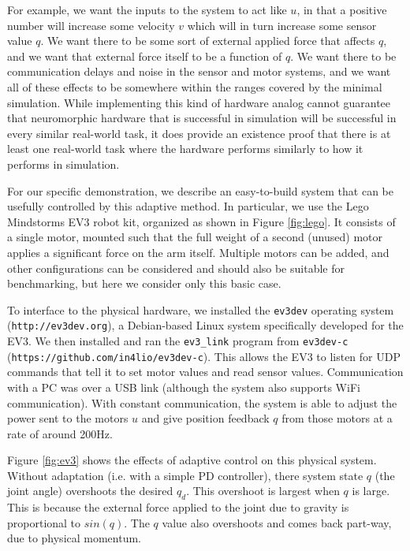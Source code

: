 \documentclass{frontiersSCNS} %
\begin{document}
For example, we want the inputs to the system to act like $u$, in that a
positive number will increase some velocity $v$ which will in turn increase some
sensor value $q$.  We want there to be some sort of external applied force that
affects $q$, and we want that external force itself to be a function of $q$.
We want there to be communication delays and noise in the sensor and motor
systems, and we want all of these effects to be somewhere within the
ranges covered by the minimal simulation.  While implementing this kind of
hardware analog cannot guarantee that neuromorphic hardware
that is successful in simulation will be successful in every similar
real-world task, it does provide an existence proof that there is at least
one real-world task where the hardware performs similarly to how it performs in simulation.

For our specific demonstration, we describe an easy-to-build system that can be usefully controlled
by this adaptive method.  In particular, we use the Lego Mindstorms EV3 robot kit,
organized as shown in Figure \ref{fig:lego}.  It consists of a single
motor, mounted such that the full weight of a second (unused) motor applies
a significant force on the arm itself.  Multiple motors can be
added, and other configurations can be considered and should also be suitable
for benchmarking, but here we consider only this basic case.

To interface to the physical hardware, we installed the \texttt{ev3dev} operating
system (\texttt{http://ev3dev.org}), a Debian-based Linux system specifically developed
for the EV3.  We then installed and ran the \texttt{ev3\_link} program from \texttt{ev3dev-c}
(\texttt{https://github.com/in4lio/ev3dev-c}).  This allows the EV3 to listen for
UDP commands that tell it to set motor values and read sensor values.
Communication with a PC was over a USB link (although the system also
supports WiFi communication).  With constant communication, the system is
able to adjust the power sent to the motors $u$ and give position feedback
$q$ from those motors at a rate of around 200Hz.

Figure \ref{fig:ev3} shows the effects of adaptive control on this physical
system.  Without adaptation (i.e. with a simple PD controller), there system
state $q$ (the joint angle) overshoots the desired $q_d$.  This overshoot
is largest when $q$ is large.  This is because the external force applied to
the joint due to gravity is proportional to $sin(q)$.  The $q$ value also
overshoots and comes back part-way, due to physical momentum.
\end{document}
